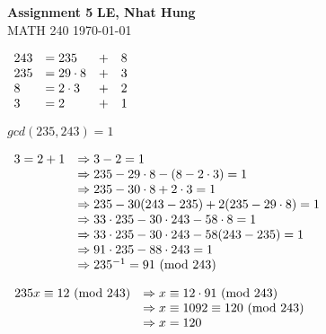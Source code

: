 \documentclass[a4paper, 11pt]{article}
\begin{document}
\noindent
\large\textbf{Assignment 5} \hfill \textbf{LE, Nhat Hung} \\
\normalsize MATH 240 \hfill \today

\begin{myEnumerate}
	\item
	\begin{myEnumerate}
    	\item
        \( \\
        \begin{array}{llll}
        	243 & = 235 & + & 8 \\
            235 & = 29 \cdot 8 & + & 3 \\
            8 & = 2 \cdot 3 & + & 2 \\
            3 & = 2 & + & 1
        \end{array} \\ \)
        
        $gcd(235, 243)=1$
        
        \( \\
        \begin{array}{ll}
            3 = 2 + 1 & \Rightarrow 3 - 2 = 1 \\
            		  & \Rightarrow 235 - 29 \cdot 8 - (8 - 2 \cdot 3) = 1 \\
                      & \Rightarrow 235 - 30 \cdot 8 + 2 \cdot 3 = 1 \\
                      & \Rightarrow 235 - 30(243 - 235) + 2(235 - 29 \cdot 8) = 1 \\
                      & \Rightarrow 33 \cdot 235 - 30 \cdot 243 - 58 \cdot 8 = 1 \\
                      & \Rightarrow 33 \cdot 235 - 30 \cdot 243 - 58(243 - 235) = 1 \\
                      & \Rightarrow 91 \cdot 235 - 88 \cdot 243 = 1 \\
                      & \Rightarrow 235^{-1} = 91 $ $ ($mod $ 243)
        \end{array} \\ \)
        
        \( \\
        \begin{array}{ll}
        	235x \equiv 12 $ $ ($mod $ 243) & \Rightarrow x \equiv 12 \cdot 91 $ $ ($mod $ 243) \\
            								& \Rightarrow x \equiv 1092 \equiv 120 $ $ ($mod $ 243) \\
                                            & \Rightarrow x = 120
        \end{array} \)
        

\end{myEnumerate}
\end{myEnumerate}
\end{document}
